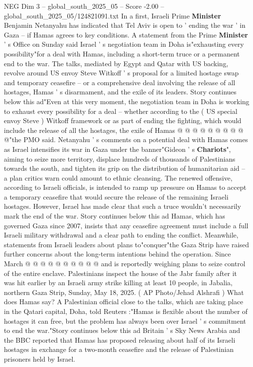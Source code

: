 \begin{textsample}{NEG Dim 3 – global\_south\_2025\_05 – Score -2.00 – global\_south\_2025\_05/124821091.txt}  \label{ex:f3_neg_174}
In a first, Israeli Prime \textbf{Minister} Benjamin Netanyahu has indicated that Tel Aviv is open to ' ending the war ' in Gaza -- if Hamas agrees to key conditions.
A statement from the Prime \textbf{Minister} ' s Office on Sunday said Israel ' s negotiation team in Doha is"exhausting every possibility"for a deal with Hamas, including a short-term truce or a permanent end to the war.
The talks, mediated by Egypt and Qatar with US backing, revolve around US envoy Steve Witkoff ' s proposal for a limited hostage swap and temporary ceasefire -- or a comprehensive deal involving the release of all hostages, Hamas ' s disarmament, and the exile of its leaders.
Story continues below this ad"Even at this very moment, the negotiation team in Doha is working to exhaust every possibility for a deal -- whether according to the ( US special envoy Steve ) Witkoff framework or as part of ending the fighting, which would include the release of all the hostages, the exile of Hamas @ @ @ @ @ @ @ @ @ @"the PMO said.
Netanyahu ' s comments on a potential deal with Hamas comes as Israel intensifies its war in Gaza under the banner"Gideon ' s \textbf{Chariots}", aiming to seize more territory, displace hundreds of thousands of Palestinians towards the south, and tighten its grip on the distribution of humanitarian aid -- a plan critics warn could amount to ethnic cleansing.
The renewed offensive, according to Israeli officials, is intended to ramp up pressure on Hamas to accept a temporary ceasefire that would secure the release of the remaining Israeli hostages.
However, Israel has made clear that such a truce wouldn't necessarily mark the end of the war.
Story continues below this ad Hamas, which has governed Gaza since 2007, insists that any ceasefire agreement must include a full Israeli military withdrawal and a clear path to ending the conflict.
Meanwhile, statements from Israeli leaders about plans to"conquer"the Gaza Strip have raised further concerns about the long-term intentions behind the operation.
Since March @ @ @ @ @ @ @ @ @ @ and is reportedly weighing plans to seize control of the entire enclave.
Palestinians inspect the house of the Jabr family after it was hit earlier by an Israeli army strike killing at least 10 people, in Jabalia, northern Gaza Strip, Sunday, May 18, 2025. ( AP Photo/Jehad Alshrafi ) What does Hamas say?
A Palestinian official close to the talks, which are taking place in the Qatari capital, Doha, told Reuters :"Hamas is flexible about the number of hostages it can free, but the problem has always been over Israel ' s commitment to end the war."Story continues below this ad Britain ' s Sky News Arabia and the BBC reported that Hamas has proposed releasing about half of its Israeli hostages in exchange for a two-month ceasefire and the release of Palestinian prisoners held by Israel.

\end{textsample}
